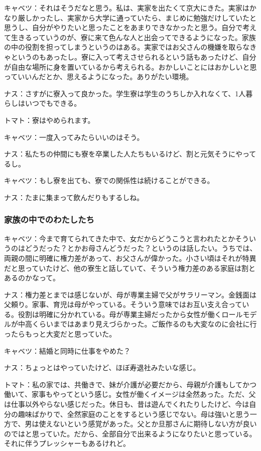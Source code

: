キャベツ：それはそうだなと思う。私は、実家を出たくて京大にきた。実家はかなり厳しかったし、実家から大学に通っていたら、まじめに勉強だけしていたと思うし、自分がやりたいと思ったことをあまりできなかったと思う。自分で考えて生きるっていうのが、寮に来て色んな人と出会ってできるようになった。家族の中の役割を担ってしまうというのはある。実家ではお父さんの機嫌を取らなきゃというのもあったし。寮に入って考えさせられるという話もあったけど、自分が自由な場所に身を置いているから考えられる。おかしいことにはおかしいと思っていいんだとか、思えるようになった。ありがたい環境。

ナス：さすがに寮入って良かった。学生寮は学生のうちしか入れなくて、1人暮らしはいつでもできる。

トマト：寮はやめられます。

キャベツ：一度入ってみたらいいのはそう。

ナス：私たちの仲間にも寮を卒業した人たちもいるけど、割と元気そうにやってるし。

キャベツ：もし寮を出ても、寮での関係性は続けることができる。

ナス：たまに集まって飲んだりもするしね。

\subsubsection{家族の中でのわたしたち}
キャベツ：今まで育てられてきた中で、女だからどうこうと言われたとかそういうのはどうだった？とかお母さんどうだった？というのは話したい。うちでは、両親の間に明確に権力差があって、お父さんが偉かった。小さい頃はそれが特異だと思っていたけど、他の寮生と話していて、そういう権力差のある家庭は割とあるのかなって。

ナス：権力差とまでは感じないが、母が専業主婦で父がサラリーマン。金銭面は父頼り。家事、育児は母がやっている。そういう意味ではお互い支え合っている。役割は明確に分かれている。母が専業主婦だったから女性が働くロールモデルが中高くらいまではあまり見えづらかった。ご飯作るのも大変なのに会社に行ったらもっと大変だと思っていた。

キャベツ：結婚と同時に仕事をやめた？

ナス：ちょっとはやっていたけど、ほぼ寿退社みたいな感じ。

トマト：私の家では、共働きで、妹が介護が必要だから、母親が介護もしてかつ働いて、家事もやってという感じ。女性が働くイメージは全然あった。ただ、父は仕事以外やらない感じだった。休日も、昔は遊んでくれたりしたけど、今は自分の趣味ばかりで、全然家庭のことをするという感じでない。母は強いと思う一方で、男は使えないという感覚があった。父とか旦那さんに期待しない方が良いのではと思っていた。だから、全部自分で出来るようになりたいと思っている。それに伴うプレッシャーもあるけれど。

